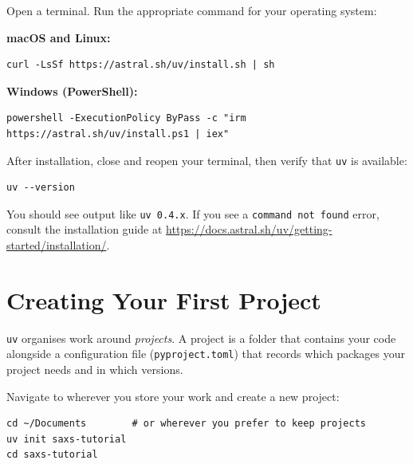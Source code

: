 \documentclass[nobib]{tufte-book}
\begin{document}
Open a terminal.
Run the appropriate command for your operating system:

\medskip
\noindent\textbf{macOS and Linux:}
\begin{lstlisting}[style=bashstyle]
curl -LsSf https://astral.sh/uv/install.sh | sh
\end{lstlisting}

\medskip
\noindent\textbf{Windows (PowerShell):}
\begin{lstlisting}[style=bashstyle]
powershell -ExecutionPolicy ByPass -c "irm https://astral.sh/uv/install.ps1 | iex"
\end{lstlisting}

\medskip
After installation, close and reopen your terminal, then verify that
\texttt{uv} is available:

\begin{lstlisting}[style=bashstyle]
uv --version
\end{lstlisting}

You should see output like \texttt{uv 0.4.x}.
If you see a \texttt{command not found} error, consult the installation
guide at \url{https://docs.astral.sh/uv/getting-started/installation/}.

\section{Creating Your First Project}

\texttt{uv} organises work around \emph{projects}.
A project is a folder that contains your code alongside a configuration file
(\texttt{pyproject.toml}) that records which packages your project needs and
in which versions.

Navigate to wherever you store your work and create a new project:

\begin{lstlisting}[style=bashstyle]
cd ~/Documents        # or wherever you prefer to keep projects
uv init saxs-tutorial
cd saxs-tutorial
\end{lstlisting}
\end{document}
